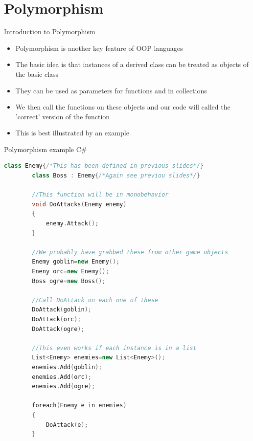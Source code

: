\part{Polymorphism}
\frame{\partpage}

\begin{frame}{Introduction to Polymorphism}
	\begin{itemize}
		\pause \item Polymorphism is another key feature of OOP languages
		\pause \item The basic idea is that instances of a derived class can be treated as objects of the basic class
		\pause \item They can be used as parameters for functions and in collections
		\pause \item We then call the functions on these objects and our code will called the 'correct' version of the function
		\pause \item This is best illustrated by an example 
	\end{itemize}
\end{frame}

\begin{frame}[fragile]{Polymorphism example C\#}
		\begin{lstlisting}[language=C++,basicstyle=\tiny,]
		class Enemy{/*This has been defined in previous slides*/}
		class Boss : Enemy{/*Again see previou slides*/}
		
		//This function will be in monobehavior
		void DoAttacks(Enemy enemy)
		{
			enemy.Attack();
		}
		
		//We probably have grabbed these from other game objects
		Enemy goblin=new Enemy();
		Eneny orc=new Enemy();
		Boss ogre=new Boss();
		
		//Call DoAttack on each one of these
		DoAttack(goblin);
		DoAttack(orc);
		DoAttack(ogre);
		
		//This even works if each instance is in a list
		List<Enemy> enemies=new List<Enemy>();
		enemies.Add(goblin);
		enemies.Add(orc);
		enemies.Add(ogre);
		
		foreach(Enemy e in enemies)
		{
			DoAttack(e);
		}
		\end{lstlisting}
\end{frame}

